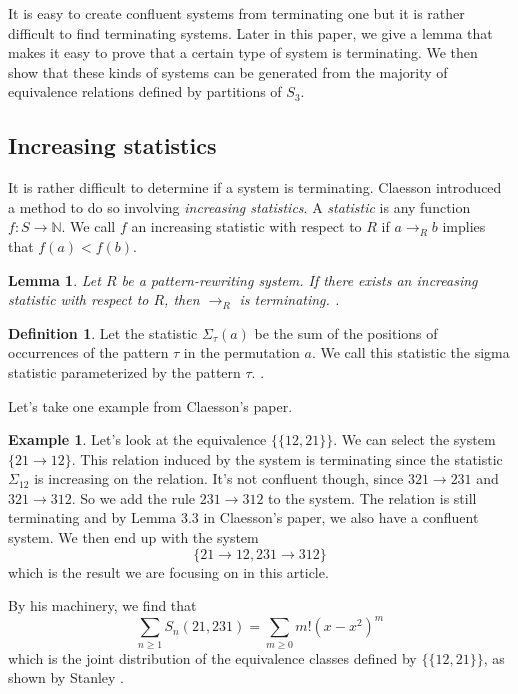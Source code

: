 \documentclass[a4paper, 11pt, english]{article}
\newcommand{\patternrule}{ \to \!}
\newtheorem{lemma}[theorem]{Lemma}
\theoremstyle{definition}
\newtheorem{definition}[theorem]{Definition}
\newtheorem{example}[theorem]{Example}
\newcommand{\Sym}{S}
\begin{document}
It is easy to create confluent systems from terminating one but it is rather difficult to find
terminating systems. Later in this paper, we give a lemma that makes it easy to prove that a certain
type of system is terminating. We then show that these kinds of systems can be generated from  the
majority of equivalence relations defined by partitions of $\Sym_3$.

\subsection{Increasing statistics}
It is rather difficult to determine if a system is terminating. Claesson introduced a method to
do so involving \emph{increasing statistics}.
A \emph{statistic} is any function $f : \Sym \to \mathbb{N}$. We call $f$ an increasing
statistic with respect to $R$ if $a \to_R b$ implies that $f(a) < f(b)$.

\begin{lemma}
    Let $R$ be a pattern-rewriting system. If there exists an increasing
    statistic with respect to $R$, then $\to_R$ is terminating.    
    \cite{claesson:2021}.
\end{lemma}

\begin{definition}
    Let the statistic $\Sigma_\tau(a)$ be the sum of the positions of occurrences of
    the pattern $\tau$ in the permutation $a$. We call this statistic the sigma statistic
    parameterized by the pattern $\tau$.
    \cite{claesson:2021}.
\end{definition}

Let's take one example from Claesson's paper.
\begin{example}
    Let's look at the equivalence $\{ \{ 12, 21 \} \}$. We can select the system $\{
        21 \to 12 \}$. This relation induced by the system is terminating since the statistic
    $\Sigma_{12}$ is increasing on the relation. It's not
    confluent though, since $321 \to 231$ and $321 \to 312$. So we add the rule
    $231 \patternrule 312$ to the system. The relation is still terminating and by Lemma
    3.3 in Claesson's paper, we also have a confluent system. We then end up with
    the system 
    \[
        \{ 21 \patternrule 12, 231 \patternrule 312 \}
    \]
    which is the result we are focusing on in this article.

    By his machinery, we find that 
    \[
        \sum_{n \geq 1} \Sym_n(21, 231) = \sum_{m \geq 0} m!(x-x^2)^m
    \]
    which is the joint distribution of the equivalence classes defined by 
    $\{ \{ 12, 21 \} \}$, as shown by Stanley \cite{stanley:2012}.
\end{example}
\end{document}
